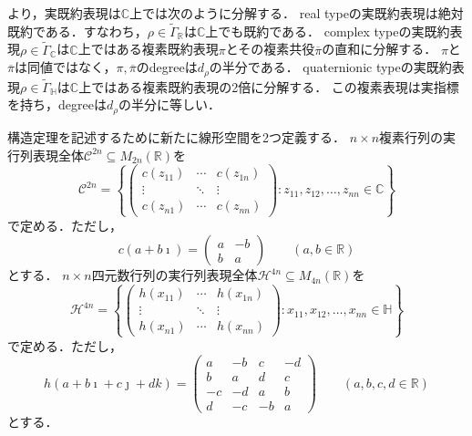 \documentclass[11pt]{article}
\theoremstyle{definition}
\begin{document}
    \cite[Chapter 13.2]{serre1977linear}より，実既約表現は$\mathbb{C}$上では次のように分解する．
    real typeの実既約表現は絶対既約である．すなわち，$\rho \in \tilde{\Gamma}_\mathbb{R}$は$\mathbb{C}$上でも既約である．
    complex typeの実既約表現$\rho \in \tilde{\Gamma}_\mathbb{C}$は$\mathbb{C}$上ではある複素既約表現$\pi$とその複素共役$\overline{\pi}$の直和に分解する．
    $\pi$と$\overline{\pi}$は同値ではなく，$\pi, \overline{\pi}$のdegreeは$d_\rho$の半分である．
    quaternionic typeの実既約表現$\rho \in \tilde{\Gamma}_\mathbb{H}$は$\mathbb{C}$上ではある複素既約表現の2倍に分解する．
    この複素表現は実指標を持ち，degreeは$d_\rho$の半分に等しい．

    構造定理を記述するために新たに線形空間を2つ定義する．
    $n \times n$複素行列の実行列表現全体$\mathcal{C}^{2n} \subseteq M_{2n}(\mathbb{R})$を
    \[
        \mathcal{C}^{2n} = \left\{
        \begin{pmatrix}
            c(z_{11}) & \cdots &c(z_{1n}) \\
            \vdots & \ddots & \vdots \\
            c(z_{n1}) & \cdots & c(z_{nn})
        \end{pmatrix}
        : z_{11}, z_{12}, \ldots, z_{nn} \in \mathbb{C} \right\}
    \]
    で定める．ただし，
    \[
        c(a+b\imath) = \begin{pmatrix} a& -b \\ b & a \end{pmatrix} \qquad (a,b \in \mathbb{R})
    \]
    とする．
    $n \times n$四元数行列の実行列表現全体$\mathcal{H}^{4n}\subseteq M_{4n}(\mathbb{R})$を
    \[
        \mathcal{H}^{4n} = \left\{
        \begin{pmatrix}
            h(x_{11}) & \cdots &h(x_{1n}) \\
            \vdots & \ddots & \vdots \\
            h(x_{n1}) & \cdots & h(x_{nn})
        \end{pmatrix}
        : x_{11}, x_{12}, \ldots, x_{nn} \in \mathbb{H} \right\}
    \]
    で定める．ただし，
    \[
        h(a+b\imath+c\jmath+dk) = \begin{pmatrix} a & -b & c & -d \\ b & a & d & c \\ -c & -d & a & b \\ d & -c & -b & a \end{pmatrix}  \qquad (a, b, c, d \in \mathbb{R})
    \]
    とする．
    
\end{document}
